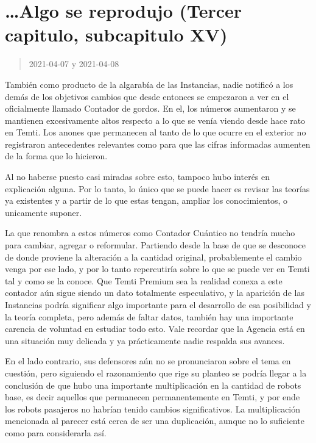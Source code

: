 \documentclass[
  spanish,
]{book}
\begin{document}
\hypertarget{algo-se-reprodujo-tercer-capitulo-subcapitulo-xv}{%
\section{\ldots Algo se reprodujo (Tercer capitulo, subcapitulo XV)}\label{algo-se-reprodujo-tercer-capitulo-subcapitulo-xv}}

\begin{quote}
2021-04-07 y 2021-04-08
\end{quote}

También como producto de la algarabía de las Instancias, nadie notificó a los demás de los objetivos cambios que desde entonces se empezaron a ver en el oficialmente llamado Contador de gordos. En el, los números aumentaron y se mantienen excesivamente altos respecto a lo que se venía viendo desde hace rato en Temti. Los anones que permanecen al tanto de lo que ocurre en el exterior no registraron antecedentes relevantes como para que las cifras informadas aumenten de la forma que lo hicieron.

Al no haberse puesto casi miradas sobre esto, tampoco hubo interés en explicación alguna. Por lo tanto, lo único que se puede hacer es revisar las teorías ya existentes y a partir de lo que estas tengan, ampliar los conocimientos, o unicamente suponer.

La que renombra a estos números como Contador Cuántico no tendría mucho para cambiar, agregar o reformular. Partiendo desde la base de que se desconoce de donde proviene la alteración a la cantidad original, probablemente el cambio venga por ese lado, y por lo tanto repercutiría sobre lo que se puede ver en Temti tal y como se la conoce. Que Temti Premium sea la realidad conexa a este contador aún sigue siendo un dato totalmente especulativo, y la aparición de las Instancias podría significar algo importante para el desarrollo de esa posibilidad y la teoría completa, pero además de faltar datos, también hay una importante carencia de voluntad en estudiar todo esto. Vale recordar que la Agencia está en una situación muy delicada y ya prácticamente nadie respalda sus avances.

En el lado contrario, sus defensores aún no se pronunciaron sobre el tema en cuestión, pero siguiendo el razonamiento que rige su planteo se podría llegar a la conclusión de que hubo una importante multiplicación en la cantidad de robots base, es decir aquellos que permanecen permanentemente en Temti, y por ende los robots pasajeros no habrían tenido cambios significativos. La multiplicación mencionada al parecer está cerca de ser una duplicación, aunque no lo suficiente como para considerarla así.
\end{document}
